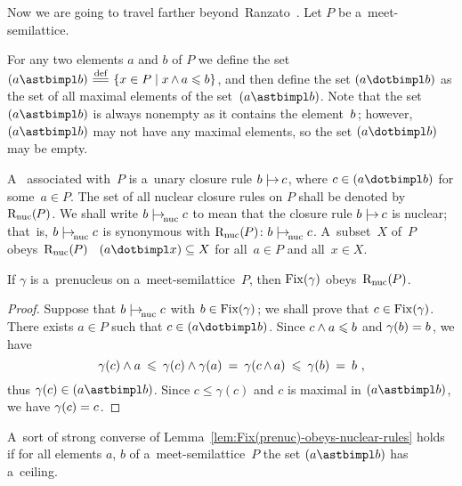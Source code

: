 \documentclass[11pt,letterpaper]{article}
\renewcommand{\thmskip}{\bigskip}
\renewcommand{\interskip}{\medskip}
\begin{document}
\pagebreak[3]
\txtskip

Now we are going to travel farther beyond~Ranzato~\cite{ranzato}.
Let $P$ be a~meet-semilattice.

For any two elements $a$ and $b$ of $P$
we define the set $(a\astbimpl b) \defeq \set{x\in P\suchthat x\narrt\meet a\leq b}$,
and then define the set $(a\dotbimpl b)$
	as the set of all maximal elements of the set~$(a\astbimpl b)$.
Note that the set $(a\astbimpl b)$ is always nonempty as it contains the element~$b\mspace{2mu}$;
however, $(a\astbimpl b)$ may not have any maximal elements,
	so the set $(a\dotbimpl b)$ may be empty.

A~ associated with~$P$ is a~unary closure rule $b\mathrel{{{|}\mspace{-3.5mu}{\rightarrow}}_{\!}}c\mspace{1mu}$,
where $c\in(a\dotbimpl b)$ for some~$a\in P$.
The set of all nuclear closure rules on $P$ shall be denoted by~$\mathrm{R}_{\mathop{\smash{\mathrm{nuc}}}\nolimits}(\mspace{-1mu} P)$.
We shall write $b\mathrel{{{|}\mspace{-3.5mu}{\rightarrow}}_{\!\mathop{\smash{\mathrm{nuc}}}\nolimits}}c$
	to mean that the closure rule $b\mathrel{{{|}\mspace{-3.5mu}{\rightarrow}}_{\!}}c$ is nuclear;
that~is, $b\mathrel{{{|}\mspace{-3.5mu}{\rightarrow}}_{\!\mathop{\smash{\mathrm{nuc}}}\nolimits}}c$ is synonymous with $\mathrm{R}_{\mathop{\smash{\mathrm{nuc}}}\nolimits}(\mspace{-1mu} P)\colon b\mathrel{{{|}\mspace{-3.5mu}{\rightarrow}}_{\!\mathop{\smash{\mathrm{nuc}}}\nolimits}}c$.
A~subset~$X$ of~$P$ obeys~$\mathrm{R}_{\mathop{\smash{\mathrm{nuc}}}\nolimits}(\mspace{-1mu} P)$
	\iff\ $(a\dotbimpl x)\subseteq X$ for all~$a\in P$ and all~$x\in X$.

\thmskip

\begin{lemma}\label{lem:Fix(prenuc)-obeys-nuclear-rules}
If\/ $\gamma$ is a~prenucleus on a~meet-semilattice\/~$P$,
	then\/ $\mathop{\smash{\mathrm{Fix}}}\nolimits(\gamma)$ obeys\/~$\mathrm{R}_{\mathop{\smash{\mathrm{nuc}}}\nolimits}(\mspace{-1mu} P)$.
\end{lemma}

\interskip

\begin{proof}
Suppose that $b\mathrel{{{|}\mspace{-3.5mu}{\rightarrow}}_{\!\mathop{\smash{\mathrm{nuc}}}\nolimits}}c$ with $b\in\mathop{\smash{\mathrm{Fix}}}\nolimits(\gamma)\mspace{2mu}$;
	we shall prove that $c\in\mathop{\smash{\mathrm{Fix}}}\nolimits(\gamma)$.
There exists $a\in P$ such that $c\in(a\dotbimpl b)$.
Since $c\wedge a\leqslant b$ and $\gamma(b)=b\mspace{1mu}$, we have
%
\begin{equation*}
\gamma(c)\wedge a
	\:\leqslant\: \gamma(c)\wedge\gamma(a)
	\:=\: \gamma(c\mspace{-1mu}\wedge\mspace{-1mu} a)
	\:\leqslant\: \gamma(b)
	\:=\: b~,
\end{equation*}
%
thus $\gamma(c)\in(a\astbimpl b)$.
Since $c\leq\gamma(c)$ and $c$ is maximal in $(a\astbimpl b)$, we have $\gamma(c)=c\mspace{1mu}$.
\end{proof}

\thmskip

A~sort of strong converse of Lemma~\ref{lem:Fix(prenuc)-obeys-nuclear-rules} holds
if for all elements $a$, $b$ of a~meet-semi\-lattice~$P$
	the set $(a\astbimpl b)$ has a~ceiling.
\end{document}
